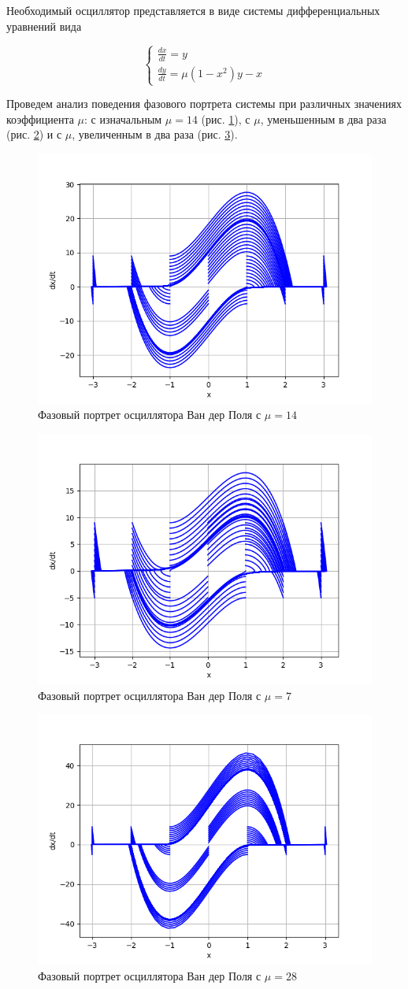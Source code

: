 Необходимый осциллятор представляется в виде системы дифференциальных уравнений вида

$$
\begin{cases}
{\frac{dx}{dt}} = y \\ 
{\frac{dy}{dt}} = \mu (1-x^2)y-x
\end{cases}
$$

Проведем анализ поведения фазового портрета системы при различных значениях коэффициента $\mu$:
с изначальным $\mu = 14$ (рис. \ref{fig:21}), с $\mu$, уменьшенным в два раза (рис. \ref{fig:22}) и с $\mu$, увеличенным в два раза (рис. \ref{fig:23}).

\begin{figure}[H]
	\centering
	\includegraphics[width=0.6\linewidth]{body/images/Oscillator-with-mu.png}
	\caption{Фазовый портрет осциллятора Ван дер Поля с $\mu=14$}
	\label{fig:21}
\end{figure}

\begin{figure}[H]
	\centering
	\includegraphics[width=0.6\linewidth]{body/images/Oscillator-with-0.5mu.png}
	\caption{Фазовый портрет осциллятора Ван дер Поля с $\mu=7$}
	\label{fig:22}
\end{figure}

\begin{figure}[H]
	\centering
	\includegraphics[width=0.6\linewidth]{body/images/Oscillator-with-2mu.png}
	\caption{Фазовый портрет осциллятора Ван дер Поля с $\mu=28$}
	\label{fig:23}
\end{figure}

